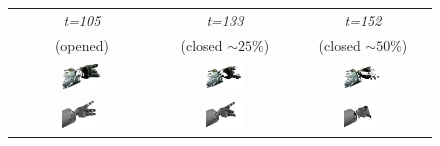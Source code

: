 \begin{figure}
\begin{tabular}{c:c:c}
\hline
\textit{t=105} & \textit{t=133} & \textit{t=152}\\
(opened) & (closed $\sim 25\%$) & (closed $\sim 50\%$)\\
\includegraphics[width=0.3\textwidth]{images/eval_vicon/sequence/finger_movement/obs_105.png} & \includegraphics[width=0.3\textwidth]{images/eval_vicon/sequence/finger_movement/obs_133.png} & \includegraphics[width=0.3\textwidth]{images/eval_vicon/sequence/finger_movement/obs_152.png} \\
\includegraphics[width=0.3\textwidth]{images/eval_vicon/sequence/finger_movement/rep_105.png} & \includegraphics[width=0.3\textwidth]{images/eval_vicon/sequence/finger_movement/rep_133.png} & \includegraphics[width=0.3\textwidth]{images/eval_vicon/sequence/finger_movement/rep_152.png} \\

\end{tabular}
\end{figure}
